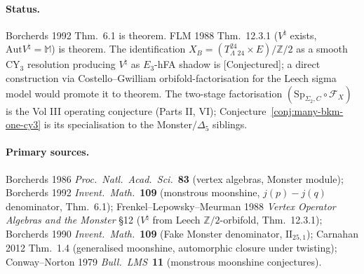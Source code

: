 \documentclass[11pt]{article}
\providecommand{\Z}{\mathbb{Z}}
\providecommand{\Leech}{\Lambda_{24}}
\providecommand{\IIlor}{\mathrm{II}_{25,1}}
\providecommand{\Vnat}{V^{\natural}}
\providecommand{\Aut}{\mathrm{Aut}}
\providecommand{\Mon}{\mathbb{M}}
\providecommand{\Sp}{\mathrm{Sp}}
\providecommand{\Fcal}{\mathcal{F}}
\providecommand{\ClaimStatusConjectured}{[Conjectured]}
\theoremstyle{plain}
\theoremstyle{definition}
\begin{document}
\paragraph{Status.} Borcherds 1992 Thm.~6.1 is theorem. FLM 1988
Thm.~12.3.1 ($V^\natural$ exists, $\Aut\Vnat=\Mon$) is theorem.
The identification $X_B=(T^{24}_\Leech\times E)/\Z/2$ as a smooth
CY$_3$ resolution producing $\Vnat$ as $E_3$-hFA shadow is
\ClaimStatusConjectured{}; a direct construction via
Costello--Gwilliam orbifold-factorisation for the Leech sigma model
would promote it to theorem. The two-stage factorisation
$(\Sp_{\Sigma_2,C}\circ\Fcal_X)$ is the Vol III operating conjecture
(Parts II, VI); Conjecture~\ref{conj:many-bkm-one-cy3} is its
specialisation to the Monster$/\Delta_5$ siblings.

\paragraph{Primary sources.} Borcherds 1986 \emph{Proc.\ Natl.\
Acad.\ Sci.}\ \textbf{83} (vertex algebras, Monster module);
Borcherds 1992 \emph{Invent.\ Math.}\ \textbf{109}
(monstrous moonshine, $j(p){-}j(q)$ denominator, Thm.~6.1);
Frenkel--Lepowsky--Meurman 1988 \emph{Vertex Operator Algebras and
the Monster} \S 12 ($\Vnat$ from Leech $\Z/2$-orbifold, Thm.~12.3.1);
Borcherds 1990 \emph{Invent.\ Math.}\ \textbf{109} (Fake Monster
denominator, $\IIlor$); Carnahan 2012 Thm.~1.4 (generalised
moonshine, automorphic closure under twisting); Conway--Norton
1979 \emph{Bull.\ LMS}\ \textbf{11} (monstrous moonshine conjectures).
\end{document}
